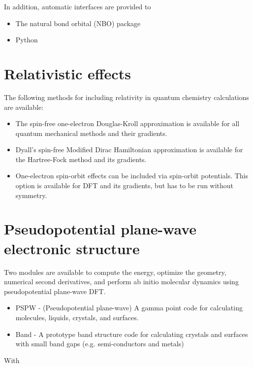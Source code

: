 In addition, automatic interfaces are provided to
\begin{itemize}
\item The natural bond orbital (NBO) package
\item Python
\end{itemize}

\section{Relativistic effects}

The following methods for including relativity in quantum chemistry 
calculations are available:
\begin{itemize}
\item The spin-free one-electron Douglas-Kroll approximation is available for all 
 quantum mechanical methods and their gradients.
\item Dyall's spin-free Modified Dirac Hamiltonian approximation is available 
 for the Hartree-Fock method and its gradients.
\item One-electron spin-orbit effects can be included via spin-orbit potentials.
 This option is available for DFT and its gradients, but has to be run without 
 symmetry.
\end{itemize}

\section{Pseudopotential plane-wave electronic structure}

Two modules are available to compute the energy, optimize the
geometry, numerical second derivatives, and perform ab initio 
molecular dynamics using pseudopotential plane-wave DFT.

\begin{itemize}
\item PSPW - (Pseudopotential plane-wave) A gamma point code for calculating
molecules, liquids, crystals, and surfaces.
\item Band - A prototype band structure code for calculating crystals and 
surfaces with small band gaps (e.g. semi-conductors and metals)
\end{itemize}

With

